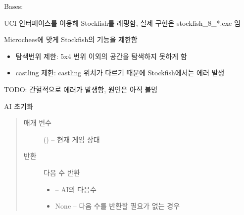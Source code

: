 \documentclass[letterpaper,10pt,english]{sphinxmanual}
\begin{document}
\begin{fulllineitems}
\label{\detokenize{agents.stockfish:agents.stockfish.agent.Stockfish}}
Bases: {\hyperref[\detokenize{agents:agents.BaseAgent}]{}}

UCI 인터페이스를 이용해 Stockfish를 래핑함, 실제 구현은 stockfish\_8\_*.exe 임

Microchees에 맞게 Stockfish의 기능을 제한함
\begin{itemize}
\item {} 
탐색번위 제한: 5x4 번위 이외의 공간을 탐색하지 못하게 함

\item {} 
castling 제한: castling 위치가 다르기 때문에 Stockfish에서는 에러 발생

\end{itemize}

TODO: 간헐적으로 에러가 발생함, 원인은 아직 불명

\begin{fulllineitems}
\label{\detokenize{agents.stockfish:agents.stockfish.agent.Stockfish.act}}
AI 초기화
\begin{quote}\begin{description}
\item[{매개 변수}] \leavevmode
{} ({\hyperref[\detokenize{scripts:scripts.run_game.State}]{}}) -- 현재 게임 상태

\item[{반환}] \leavevmode

다음 수 반환
\begin{itemize}
\item {} 
 -- AI의 다음수

\item {} 
None -- 다음 수를 반환할 필요가 없는 경우

\end{itemize}


\end{description}\end{quote}


\end{fulllineitems}
\end{fulllineitems}
\end{document}
